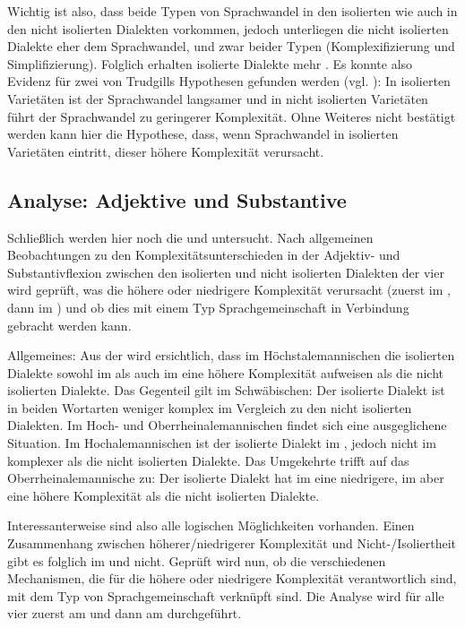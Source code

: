 Wichtig ist also, dass beide Typen von Sprachwandel in den isolierten wie auch in den nicht isolierten Dialekten vorkommen, jedoch unterliegen die nicht isolierten Dialekte eher dem Sprachwandel, und zwar beider Typen (Komplexifizierung und Simplifizierung). Folglich erhalten isolierte Dialekte mehr . Es konnte also Evidenz für zwei von Trudgills Hypothesen gefunden werden (vgl. ): In isolierten Varietäten ist der Sprachwandel langsamer und in nicht isolierten Varietäten führt der Sprachwandel zu geringerer Komplexität. Ohne Weiteres nicht bestätigt werden kann hier die Hypothese, dass, wenn Sprachwandel in isolierten Varietäten eintritt, dieser höhere Komplexität verursacht.

\subsection{Analyse: Adjektive und Substantive}\label{6.5.3}

Schließlich werden hier noch die  und  untersucht. Nach allgemeinen Beobachtungen zu den Komplexitätsunterschieden in der Adjektiv- und Substantivflexion zwischen den isolierten und nicht isolierten Dialekten der vier  wird geprüft, was die höhere oder niedrigere Komplexität verursacht (zuerst im , dann im ) und ob dies mit einem Typ Sprachgemeinschaft in Verbindung gebracht werden kann.

{Allgemeines:} Aus der  wird ersichtlich, dass im Höchstalemannischen die isolierten Dialekte sowohl im  als auch im  eine höhere Komplexität aufweisen als die nicht isolierten Dialekte. Das Gegenteil gilt im Schwäbischen: Der isolierte Dialekt ist in beiden Wortarten weniger komplex im Vergleich zu den nicht isolierten Dialekten. Im Hoch- und Oberrheinalemannischen findet sich eine ausgeglichene Situation. Im Hochalemannischen ist der isolierte Dialekt im , jedoch nicht im  komplexer als die nicht isolierten Dialekte. Das Umgekehrte trifft auf das Oberrheinalemannische zu: Der isolierte Dialekt hat im  eine niedrigere, im  aber eine höhere Komplexität als die nicht isolierten Dialekte.

Interessanterweise sind also alle logischen Möglichkeiten vorhanden. Einen Zusammenhang zwischen höherer/niedrigerer Komplexität und Nicht-/I\-so\-liert\-heit gibt es folglich im  und  nicht. Geprüft wird nun, ob die verschiedenen Mechanismen, die für die höhere oder niedrigere Komplexität verantwortlich sind, mit dem Typ von Sprachgemeinschaft verknüpft sind. Die Analyse wird für alle vier  zuerst am  und dann am  durchgeführt.

